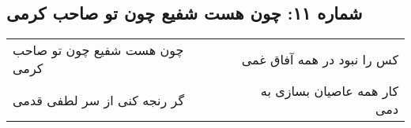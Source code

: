 \begin{center}
\section*{شماره ۱۱: چون هست شفیع چون تو صاحب کرمی}
\label{sec:011}
\begin{longtable}{l p{0.5cm} r}
چون هست شفیع چون تو صاحب کرمی
&&
کس را نبود در همه آفاق غمی
\\
گر رنجه کنی از سر لطفی قدمی
&&
کار همه عاصیان بسازی به دمی
\\
\end{longtable}
\end{center}

